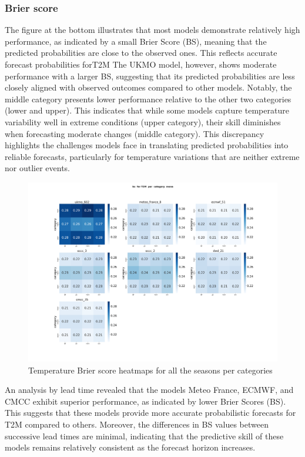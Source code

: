 \subsubsection{Brier score}

The figure at the bottom illustrates that most models demonstrate relatively high performance, as indicated by a small Brier Score (BS), meaning that the predicted probabilities are close to the observed ones. This reflects accurate forecast probabilities forT2M The UKMO model, however, shows moderate performance with a larger BS, suggesting that its predicted probabilities are less closely aligned with observed outcomes compared to other models. Notably, the middle category presents lower performance relative to the other two categories (lower and upper). This indicates that while some models capture temperature variability well in extreme conditions (upper category), their skill diminishes when forecasting moderate changes (middle category). This discrepancy highlights the challenges models face in translating predicted probabilities into reliable forecasts, particularly for temperature variations that are neither extreme nor outlier events. 


\begin{figure}[H]
    \centering
    \includegraphics[width=1\linewidth]{plots/prob/bs/bs_T2M_category_mena.png}
    \caption{Temperature Brier score heatmaps for all the seasons per categories}
    \label{fig:CORR_djf_t2m}
\end{figure}
An analysis by lead time revealed that the models Meteo France, ECMWF, and CMCC exhibit superior performance, as indicated by lower Brier Scores (BS). This suggests that these models provide more accurate probabilistic forecasts for T2M compared to others. Moreover, the differences in BS values between successive lead times are minimal, indicating that the predictive skill of these models remains relatively consistent as the forecast horizon increases.

